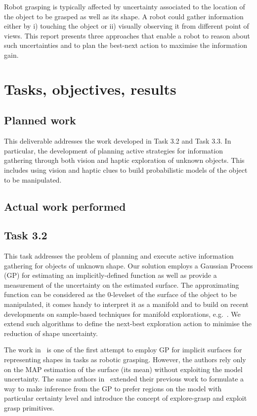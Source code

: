 \documentclass[a4paper,11pt,pdf]{../templates/pacmanreport}
\begin{document}
Robot grasping is typically affected by uncertainty associated to the location of the object to be grasped as well as its shape. A robot could gather information either by i) touching the object or ii) visually observing it from different point of views. This report presents three approaches that enable a robot to reason about such uncertainties and to plan the best-next action to maximise the information gain.


\newpage

\section{Tasks, objectives, results}

\subsection{Planned work}

This deliverable addresses the work developed in Task 3.2 and Task 3.3. In particular, the development of planning active strategies for information gathering through both vision and haptic exploration of unknown objects. This includes using vision and haptic clues to build probabilistic models of the object to be manipulated.   

\subsection{Actual work performed}

\subsection{Task 3.2}

This task addresses the problem of planning and execute active information gathering for objects of unknown shape. Our solution employs a Gaussian Process (GP) for estimating an implicitly-defined function as well as provide a measurement of the uncertainty on the estimated surface. The approximating function can be considered as the 0-levelset of the surface of the object to be manipulated, it comes handy to interpret it as a manifold and to build on recent developments on sample-based techniques for manifold explorations, e.g.~\cite{Jaillet2013Path}. We extend such algorithms to define the next-best exploration action to minimise the reduction of shape uncertainty. 

The work in~\cite{Dragiev2011Gaussian} is one of the first attempt to employ GP for implicit surfaces for representing shapes in tasks as robotic grasping. However, the authors rely only on the MAP estimation of the surface (its mean) without exploiting the model uncertainty. The same authors in~\cite{Dragiev2013Uncertainty} extended their previous work to formulate a way to make inference from the GP to prefer regions on the model with particular certainty level and introduce the concept of explore-grasp and exploit grasp primitives. 
\end{document}
